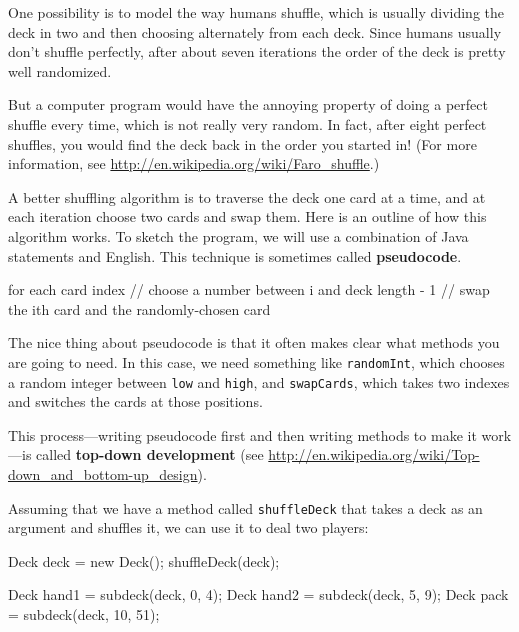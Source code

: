 \documentclass[12pt]{book}
\theoremstyle{exercise}
\newcommand{\java}[1]{\verb"#1"}
\newcommand{\java}[1]{\lstinline{#1}} %
\begin{document}
One possibility is to model the way humans shuffle, which is usually dividing the deck in two and then choosing alternately from each deck.
Since humans usually don't shuffle perfectly, after about seven iterations the order of the deck is pretty well randomized.

But a computer program would have the annoying property of doing a perfect shuffle every time, which is not really very random.
In fact, after eight perfect shuffles, you would find the deck back in the order you started in!
(For more information, see \url{http://en.wikipedia.org/wiki/Faro_shuffle}.)


A better shuffling algorithm is to traverse the deck one card at a time, and at each iteration choose two cards and swap them.
Here is an outline of how this algorithm works.
To sketch the program, we will use a combination of Java statements and English.
This technique is sometimes called {\bf pseudocode}.

\begin{code}
    for each card index {
        // choose a number between i and deck length - 1
        // swap the ith card and the randomly-chosen card
    }
\end{code}


The nice thing about pseudocode is that it often makes clear what methods you are going to need.
In this case, we need something like \java{randomInt}, which chooses a random integer between \java{low} and \java{high}, and \java{swapCards}, which takes two indexes and switches the cards at those positions.


This process---writing pseudocode first and then writing methods to make it work---is called {\bf top-down development} (see \url{http://en.wikipedia.org/wiki/Top-down_and_bottom-up_design}).


Assuming that we have a method called \java{shuffleDeck} that takes a deck as an argument and shuffles it, we can use it to deal two players:

\begin{code}
    Deck deck = new Deck();
    shuffleDeck(deck);

    Deck hand1 = subdeck(deck, 0, 4);
    Deck hand2 = subdeck(deck, 5, 9);
    Deck pack = subdeck(deck, 10, 51);
\end{code}
\end{document}
